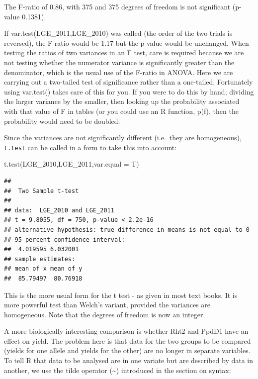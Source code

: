 \documentclass[
]{book}
\newenvironment{Shaded}{\begin{snugshade}}{\end{snugshade}}
\newcommand{\AttributeTok}[1]{\textcolor[rgb]{0.77,0.63,0.00}{#1}}
\newcommand{\FunctionTok}[1]{\textcolor[rgb]{0.00,0.00,0.00}{#1}}
\newcommand{\NormalTok}[1]{#1}
\begin{document}
The F-ratio of 0.86, with 375 and 375 degrees of freedom is not significant (p-value 0.1381).

If var.test(LGE\_2011,LGE\_2010) was called (the order of the two trials is reversed), the F-ratio would be 1.17 but the p-value would be unchanged. When testing the ratios of two variances in an F test, care is required because we are not testing whether the numerator variance is significantly greater than the denominator, which is the usual use of the F-ratio in ANOVA. Here we are carrying out a two-tailed test of significance rather than a one-tailed. Fortunately using var.test() takes care of this for you. If you were to do this by hand; dividing the larger variance by the smaller, then looking up the probability associated with that value of F in tables (or you could use an R function, p(f), then the probability would need to be doubled.

Since the variances are not significantly different (i.e.~they are homogeneous), \texttt{t.test} can be called in a form to take this into account:

\begin{Shaded}
\begin{Highlighting}[]
\FunctionTok{t.test}\NormalTok{(LGE\_2010,LGE\_2011,}\AttributeTok{var.equal =}\NormalTok{ T)}
\end{Highlighting}
\end{Shaded}

\begin{verbatim}
## 
##  Two Sample t-test
## 
## data:  LGE_2010 and LGE_2011
## t = 9.8055, df = 750, p-value < 2.2e-16
## alternative hypothesis: true difference in means is not equal to 0
## 95 percent confidence interval:
##  4.019595 6.032001
## sample estimates:
## mean of x mean of y 
##  85.79497  80.76918
\end{verbatim}

This is the more usual form for the t test - as given in most text books. It is more powerful test than Welch's variant, provided the variances are homogeneous. Note that the degrees of freedom is now an integer.

A more biologically interesting comparison is whether Rht2 and PpdD1 have an effect on yield. The problem here is that data for the two groups to be compared (yields for one allele and yields for the other) are no longer in separate variables. To tell R that data to be analysed are in one variate but are described by data in another, we use the tilde operator (\textasciitilde) introduced in the section on syntax:
\end{document}
